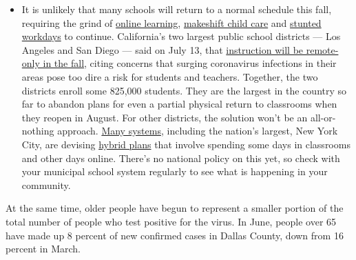\begin{itemize}
  \begin{itemize}
  \tightlist
  \item
    It is unlikely that many schools will return to a normal schedule
    this fall, requiring the grind of
    \href{https://www.nytimes.com/2020/06/05/us/coronavirus-education-lost-learning.html?action=click\&pgtype=Article\&state=default\&region=MAIN_CONTENT_3\&context=storylines_faq}{online
    learning},
    \href{https://www.nytimes.com/2020/05/29/us/coronavirus-child-care-centers.html?action=click\&pgtype=Article\&state=default\&region=MAIN_CONTENT_3\&context=storylines_faq}{makeshift
    child care} and
    \href{https://www.nytimes.com/2020/06/03/business/economy/coronavirus-working-women.html?action=click\&pgtype=Article\&state=default\&region=MAIN_CONTENT_3\&context=storylines_faq}{stunted
    workdays} to continue. California's two largest public school
    districts --- Los Angeles and San Diego --- said on July 13, that
    \href{https://www.nytimes.com/2020/07/13/us/lausd-san-diego-school-reopening.html?action=click\&pgtype=Article\&state=default\&region=MAIN_CONTENT_3\&context=storylines_faq}{instruction
    will be remote-only in the fall}, citing concerns that surging
    coronavirus infections in their areas pose too dire a risk for
    students and teachers. Together, the two districts enroll some
    825,000 students. They are the largest in the country so far to
    abandon plans for even a partial physical return to classrooms when
    they reopen in August. For other districts, the solution won't be an
    all-or-nothing approach.
    \href{https://bioethics.jhu.edu/research-and-outreach/projects/eschool-initiative/school-policy-tracker/}{Many
    systems}, including the nation's largest, New York City, are
    devising
    \href{https://www.nytimes.com/2020/06/26/us/coronavirus-schools-reopen-fall.html?action=click\&pgtype=Article\&state=default\&region=MAIN_CONTENT_3\&context=storylines_faq}{hybrid
    plans} that involve spending some days in classrooms and other days
    online. There's no national policy on this yet, so check with your
    municipal school system regularly to see what is happening in your
    community.
  \end{itemize}
\end{itemize}

At the same time, older people have begun to represent a smaller portion
of the total number of people who test positive for the virus. In June,
people over 65 have made up 8 percent of new confirmed cases in Dallas
County, down from 16 percent in March.

